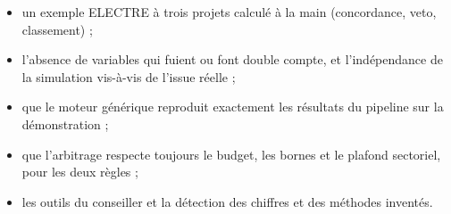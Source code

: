 \begin{itemize}
  \item un exemple ELECTRE à trois projets calculé à la main (concordance, veto, classement) ;
  \item l'absence de variables qui fuient ou font double compte, et l'indépendance de la simulation vis-à-vis de
        l'issue réelle ;
  \item que le moteur générique reproduit exactement les résultats du pipeline sur la démonstration ;
  \item que l'arbitrage respecte toujours le budget, les bornes et le plafond sectoriel, pour les deux règles ;
  \item les outils du conseiller et la détection des chiffres et des méthodes inventés.
\end{itemize}
